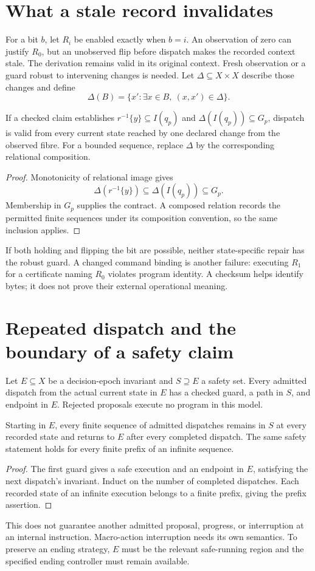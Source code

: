 \section{What a stale record invalidates}
For a bit $b$, let $R_i$ be enabled exactly when $b=i$. An observation of zero can justify $R_0$, but an unobserved flip before dispatch makes the recorded context stale. The derivation remains valid in its original context. Fresh observation or a guard robust to intervening changes is needed.
Let $\Delta\subseteq X\times X$ describe those changes and define
\[
\Delta(B)=\{x':\exists x\in B,\ (x,x')\in\Delta\}.
\]
\begin{Coreproposition}
If a checked claim establishes $r^{-1}\{y\}\subseteq I(q_p)$ and $\Delta(I(q_p))\subseteq G_p$, dispatch is valid from every current state reached by one declared change from the observed fibre. For a bounded sequence, replace $\Delta$ by the corresponding relational composition.
\end{Coreproposition}
\begin{proof}
Monotonicity of relational image gives
\[
\Delta(r^{-1}\{y\})\subseteq\Delta(I(q_p))\subseteq G_p.
\]
Membership in $G_p$ supplies the contract. A composed relation records the permitted finite sequences under its composition convention, so the same inclusion applies.
\end{proof}
If both holding and flipping the bit are possible, neither state-specific repair has the robust guard. A changed command binding is another failure: executing $R_1$ for a certificate naming $R_0$ violates program identity. A checksum helps identify bytes; it does not prove their external operational meaning.

\section{Repeated dispatch and the boundary of a safety claim}
Let $E\subseteq X$ be a decision-epoch invariant and $S\supseteq E$ a safety set. Every admitted dispatch from the actual current state in $E$ has a checked guard, a path in $S$, and endpoint in $E$. Rejected proposals execute no program in this model.
\begin{Coretheorem}
Starting in $E$, every finite sequence of admitted dispatches remains in $S$ at every recorded state and returns to $E$ after every completed dispatch. The same safety statement holds for every finite prefix of an infinite sequence.
\end{Coretheorem}
\begin{proof}
The first guard gives a safe execution and an endpoint in $E$, satisfying the next dispatch's invariant. Induct on the number of completed dispatches. Each recorded state of an infinite execution belongs to a finite prefix, giving the prefix assertion.
\end{proof}
This does not guarantee another admitted proposal, progress, or interruption at an internal instruction. Macro-action interruption needs its own semantics. To preserve an ending strategy, $E$ must be the relevant safe-running region and the specified ending controller must remain available.

